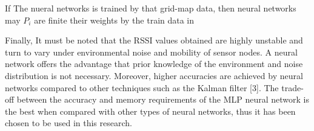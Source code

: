 \documentclass{ieeeaccess}
\begin{document}
If The nueral networks is trained by that grid-map data, then neural networks may  $P_i$ are finite their weights by the train data in  


%
Finally, It must be noted that the RSSI values obtained are highly unstable and turn to vary under
environmental noise and mobility of sensor nodes. A neural network offers the advantage that
prior knowledge of the environment and noise distribution is not necessary. Moreover, higher
accuracies are achieved by neural networks compared to other techniques such as the Kalman
filter [3]. The trade-off between the accuracy and memory requirements of the MLP neural
network is the best when compared with other types of neural networks, thus it has been chosen
to be used in this research. 

\end{document}

